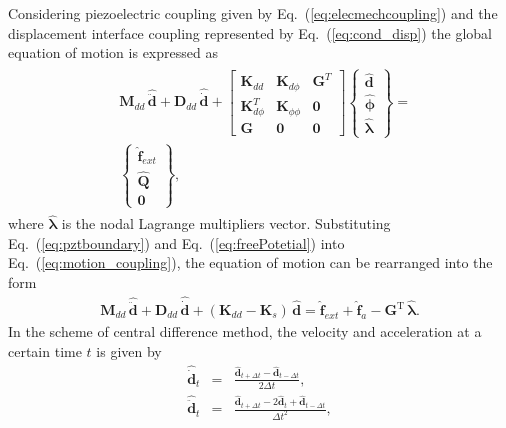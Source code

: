 \documentclass[a4paper,fleqn]{cas-dc}
\begin{document}
Considering piezoelectric coupling given by Eq.~(\ref{eq:elecmechcoupling}) and the displacement interface coupling represented by Eq.~(\ref{eq:cond_disp}) the global equation of motion is expressed as
\begin{eqnarray}
	\label{eq:motion_coupling}
	\begin{split}
	&\textbf{M}_{dd}\,\widehat{\ddot{\textbf{d}}} +
	\textbf{D}_{dd}\,\widehat{\dot{\textbf{d}}} +
	\left [\begin{array}{ccc}
		\textbf{K}_{dd}&\textbf{K}_{d\phi}&\textbf{G}^T\\
		\textbf{K}_{d\phi}^T&\textbf{K}_{\phi \phi}&\textbf{0}\\
		\textbf{G}&\textbf{0}&\textbf{0}
	\end{array}\right]
	\left \{\begin{array}{c}
		\widehat{\textbf{d}}\\
		\widehat{\boldsymbol{\phi}}\\
		\widehat{\boldsymbol{\lambda}}
	\end{array}\right\} = \\
	&\left \{\begin{array}{c}
		\widehat{\textbf{f}}_{ext} \\
		\widehat{\textbf{Q}}\\
		\textbf{0}
	\end{array}\right \},
	\end{split}
\end{eqnarray}
where \(\widehat{\boldsymbol{\lambda}}\) is the nodal Lagrange multipliers vector.
Substituting Eq.~(\ref{eq:pztboundary}) and Eq.~(\ref{eq:freePotetial}) into Eq.~(\ref{eq:motion_coupling}), the equation of motion can be rearranged into the form
\begin{eqnarray}
	\textbf{M}_{dd}\,\widehat{\ddot{\textbf{d}}} + \textbf{D}_{dd} \,\widehat{\dot{\textbf{d}}} + (\textbf{K}_{dd}-\textbf{K}_{s}) \,\widehat{\textbf{d}}  = \widehat{\textbf{f}}_{ext} + \widehat{\textbf{f}}_{a} - \textbf{G}^{\mathrm{T}}\,\widehat{\boldsymbol{\lambda}}.
	\label{eq:motionD}
\end{eqnarray}
In the scheme of central difference method, the velocity and acceleration at a certain time \(t\) is given by
\begin{eqnarray}
	\label{eq:v}
	\widehat{\dot{\textbf{d}}}_{t} & = & \frac{\widehat{\textbf{d}}_{t+\Delta t} - \widehat{\textbf{d}}_{t-\Delta t}}{2\Delta t},\\
	\label{eq:a}
	\widehat{\ddot{\textbf{d}}}_{t} & = & \frac{\widehat{\textbf{d}}_{t+\Delta t} - 2\widehat{\textbf{d}}_{t} + \widehat{\textbf{d}}_{t-\Delta t}}{\Delta t^2},
\end{eqnarray}
\end{document}
